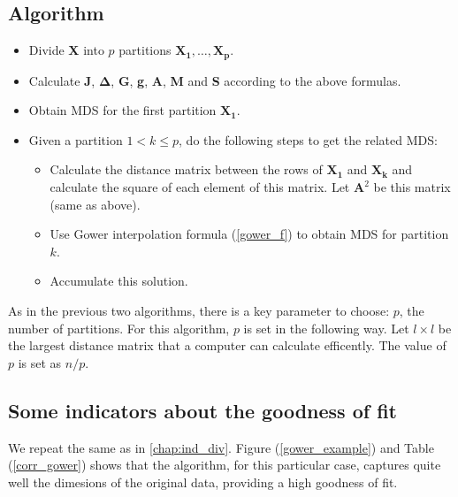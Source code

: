 \documentclass[11pt]{report}
\begin{document}
\subsection{Algorithm}

\begin{itemize}
\item Divide \textbf{X} into $p$ partitions $\mathbf{X_1},\dots, \mathbf{X_p}$.

\item Calculate \textbf{J}, $\mathbf{\Delta}$, \textbf{G}, \textbf{g},
\textbf{A}, \textbf{M} and \textbf{S} according to the above formulas.

\item Obtain MDS for the first partition $\mathbf{X_1}$. 

\item Given a partition $1 < k \leq p$, do the following steps to get the 
related MDS:

\begin{itemize}

\item Calculate the distance matrix between the rows of $\mathbf{X_1}$ and
$\mathbf{X_k}$ and calculate the square of each element of this matrix. Let
$\mathbf{A}^2$ be this matrix (same as above).

\item Use Gower interpolation formula (\ref{gower_f}) to obtain MDS for 
partition $k$. 

\item Accumulate this solution.


\end{itemize}

\end{itemize}


As in the previous two algorithms, there is a key parameter to choose: $p$,
the number of partitions. For this algorithm, $p$ is set in the following way.
Let $l \times l$ be the largest distance matrix that a computer can calculate 
efficently. The value of $p$ is set as $n/p$.


\subsection{Some indicators about the goodness of fit}
We repeat the same as in \autoref{chap:ind_div}. Figure (\ref{gower_example}) 
and Table (\ref{corr_gower}) shows that the algorithm, for this particular case, 
captures quite well the dimesions of the original data, providing a high 
goodness of fit.
\end{document}

